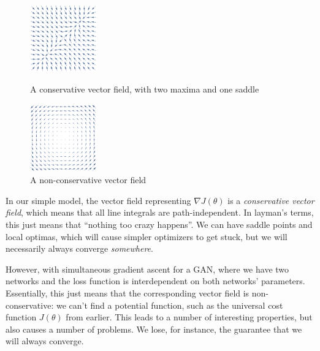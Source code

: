 \documentclass{article}
\begin{document}
\begin{figure}
  \begin{center}
    \vspace*{-0.3in}
    \includegraphics[width=0.26\textwidth]{conservative_vector_field}   
  \end{center}
  \vspace*{-0.1in}
  \caption{A conservative vector field, with two maxima and one saddle}
  
  
  \begin{center}
    \includegraphics[width=0.26\textwidth]{nonconservative_vector_field}   
  \end{center}
  \vspace*{-0.1in}
  \caption{A non-conservative vector field}
\end{figure}

In our simple model, the vector field representing $\nabla{J(\theta)}$ is a \textit{conservative vector field}, which means that all line integrals are path-independent. In layman's terms, this just means that ``nothing too crazy happens''. We can have saddle points and local optimas, which will cause simpler optimizers to get stuck, but we will necessarily always converge \textit{somewhere}.

However, with simultaneous gradient ascent for a GAN, where we have two networks and the loss function is interdependent on both networks' parameters. Essentially, this just means that the corresponding vector field is non-conservative: we can't find a potential function, such as the universal cost function $J(\theta)$ from earlier. This leads to a number of interesting properties, but also causes a number of problems. We lose, for instance, the guarantee that we will always converge.
\end{document}
